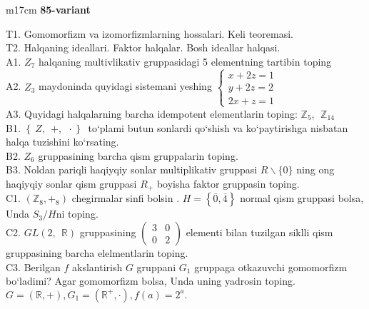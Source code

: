 \documentclass{article}
\begin{document}
\begin{tabular}{m{17cm}}
\textbf{85-variant}
\newline

T1. Gomomorfizm va izomorfizmlarning hossalari. Keli teoremasi. \\
T2. Halqaning ideallari. Faktor halqalar. Bosh ideallar halqasi. \\
A1. \(Z_{7}\) halqaning multivlikativ gruppasidagi 5 elementning tartibin toping \\
A2. \(Z_{3}\) maydoninda quyidagi sistemani yeshing \(\left\{ \begin{matrix}
x + 2z = 1 \\
y + 2z = 2 \\
2x + z = 1
\end{matrix} \right.\ \) \\
A3. Quyidagi halqalarning barcha idempotent elementlarin toping: \(\mathbb{Z}_{5},\ \ \mathbb{Z}_{14}\) \\
B1. \(\left\{ \left. \ Z,\ \  + ,\ \  \cdot \right\} \right.\ \) to`plami butun sonlardi qo`shish va ko`paytirishga nisbatan halqa tuzishini ko`rsating. \\
B2. \(Z_{6}\) gruppasining barcha qism gruppalarin toping. \\
B3. Noldan pariqli haqiyqiy sonlar multiplikativ gruppasi \(R\backslash\{ 0\}\) ning o\textquotesingle ng haqiyqiy sonlar qism gruppasi \(R_{+}\) boyisha faktor gruppasin toping. \\
C1. \(\left( \mathbb{Z}_{8}, +_{8} \right)\) chegirmalar sinfi bo\textquotesingle lsin . \(H = \left\{ \overline{0},\overline{4} \right\}\) normal qism gruppasi bolsa, Unda \(S_{3}/H\)ni toping. \\
C2. \(GL(2,\mathbb{\ \ R})\) gruppasining \(\begin{pmatrix}
3 & 0 \\
0 & 2
\end{pmatrix}\) elementi bilan tuzilgan siklli qism gruppasining barcha elelmentlarin toping. \\
C3. Berilgan \(f\) akslantirish \(G\) gruppani \(G_{1}\) gruppaga o\textquotesingle tkazuvchi gomomorfizm bo`ladimi? Agar gomomorfizm bolsa, Unda uning yadrosin toping.\(G = (\mathbb{R}, + ),G_{1} = \left( \mathbb{R}^{+}, \cdot \right),f(a) = 2^{a}.\) \\

\end{tabular}
\vspace{1cm}
\end{document}
